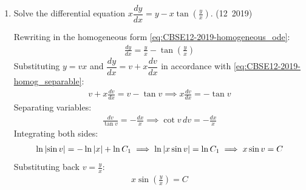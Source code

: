 \begin{enumerate}[label=\thesubsection.\arabic*, ref=\thesubsection.\theenumi]
\solution
Using partial fraction decomposition from \eqref{eq:CBSE12-2019-partial_fractions}:
\begin{align}
	\frac{x^2 + x + 1}{\brak{x + 2}\brak{x^2 + 1}} = \frac{A}{x + 2} + \frac{Bx + C}{x^2 + 1}
\end{align}
Multiplying by $\brak{x + 2}\brak{x^2 + 1}$:
\begin{align}
	x^2 + x + 1 &= A\brak{x^2 + 1} + \brak{Bx + C}\brak{x + 2} \\
	&= \brak{A + B}x^2 + \brak{2B + C}x + \brak{A + 2C}
\end{align}
Comparing coefficients of like powers of $x$:
\begin{align}
	A + B &= 1 \\
	2B + C &= 1 \\
	A + 2C &= 1
\end{align}
Solving this linear system yields $A = \frac{3}{5}$, $B = \frac{2}{5}$, and $C = \frac{1}{5}$. Thus:
\begin{align}
	\frac{x^2 + x + 1}{\brak{x + 2}\brak{x^2 + 1}} = \frac{3}{5}\brak{\frac{1}{x + 2}} + \frac{1}{5}\brak{\frac{2x}{x^2 + 1}} + \frac{1}{5}\brak{\frac{1}{x^2 + 1}}
\end{align}
Integrating term-by-term using \eqref{eq:CBSE12-2019-int_linear_denom}--\eqref{eq:CBSE12-2019-int_arctan}:
\begin{align}
	I &= \frac{3}{5}\int \frac{1}{x + 2}\,dx + \frac{1}{5}\int \frac{2x}{x^2 + 1}\,dx + \frac{1}{5}\int \frac{1}{x^2 + 1}\,dx \\
	&= \frac{3}{5}\ln\abs{x + 2} + \frac{1}{5}\ln\brak{x^2 + 1} + \frac{1}{5}\tan^{-1}x + C
\end{align}


\item Solve the differential equation $x\dfrac{dy}{dx} = y - x\tan\left(\frac{y}{x}\right)$.
\hfill (12~2019)

\solution
Rewriting in the homogeneous form \eqref{eq:CBSE12-2019-homogeneous_ode}:
\begin{align}
	\frac{dy}{dx} = \frac{y}{x} - \tan\left(\frac{y}{x}\right)
\end{align}
Substituting $y = vx$ and $\dfrac{dy}{dx} = v + x\dfrac{dv}{dx}$ in accordance with \eqref{eq:CBSE12-2019-homog_separable}:
\begin{align}
	v + x\frac{dv}{dx} = v - \tan v \implies x\frac{dv}{dx} = -\tan v
\end{align}
Separating variables:
\begin{align}
	\frac{dv}{\tan v} = -\frac{dx}{x} \implies \cot v\,dv = -\frac{dx}{x}
\end{align}
Integrating both sides:
\begin{align}
	\ln\left\vert\sin v\right\vert = -\ln\left\vert x\right\vert + \ln C_1 \implies \ln\left\vert x\sin v\right\vert = \ln C_1 \implies x\sin v = C
\end{align}
Substituting back $v = \frac{y}{x}$:
\begin{align}
	x\sin\left(\frac{y}{x}\right) = C
\end{align}




\end{enumerate}
